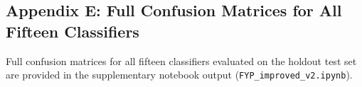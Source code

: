 \documentclass[12pt, oneside]{article} %
\begin{document}
\begin{appendices}
\section*{Appendix E: Full Confusion Matrices for All Fifteen Classifiers}
\label{app:E}

Full confusion matrices for all fifteen classifiers evaluated on the holdout test set are provided in the supplementary notebook output (\texttt{FYP\_improved\_v2.ipynb}).

\end{appendices}
\end{document}
